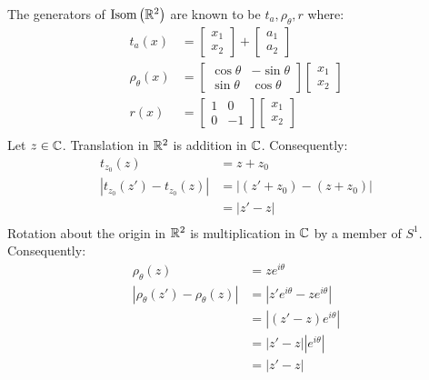 \documentclass{article}
\begin{document}
\problem
The generators of $\mathrm{Isom}\left(\mathbb{R}^2\right)$ are known to be $t_a, \rho_{\theta}, r$ where:
\begin{equation}
    \begin{split}
        t_a\left(x\right) & = \begin{bmatrix} x_1 \\ x_2\end{bmatrix} + \begin{bmatrix} a_1 \\ a_2\end{bmatrix} \\
        \rho_{\theta}\left(x\right) & = \begin{bmatrix} \cos\theta & -\sin\theta \\ \sin\theta & \cos\theta \end{bmatrix}\begin{bmatrix} x_1 \\ x_2\end{bmatrix} \\
        r\left(x\right) & = \begin{bmatrix} 1 & 0 \\ 0 & -1 \end{bmatrix}\begin{bmatrix} x_1 \\ x_2\end{bmatrix} \\
    \end{split}
\end{equation}
Let $z \in \mathbb{C}$. Translation in $\mathbb{R}^2$ is addition in $\mathbb{C}$. Consequently:
\begin{equation}
    \begin{split}
        t_{z_0}\left(z\right) & = z + z_0 \\
        |t_{z_0}\left(z'\right) - t_{z_0}\left(z\right)| & = |\left(z' + z_0\right) - \left(z + z_0\right)| \\
        & = |z' - z| \\
    \end{split}
\end{equation}
Rotation about the origin in $\mathbb{R}^2$ is multiplication in $\mathbb{C}$ by a member of $S^1$. Consequently:
\begin{equation}
    \begin{split}
        \rho_{\theta}\left(z\right) & = ze^{i\theta} \\
        |\rho_{\theta}\left(z'\right) - \rho_{\theta}\left(z\right)| & = |z'e^{i\theta} - ze^{i\theta}| \\
        & = |\left(z' - z\right)e^{i\theta}| \\
        & = |z' - z||e^{i\theta}| \\
        & = |z' - z| \\
    \end{split}
\end{equation}
\end{document}

